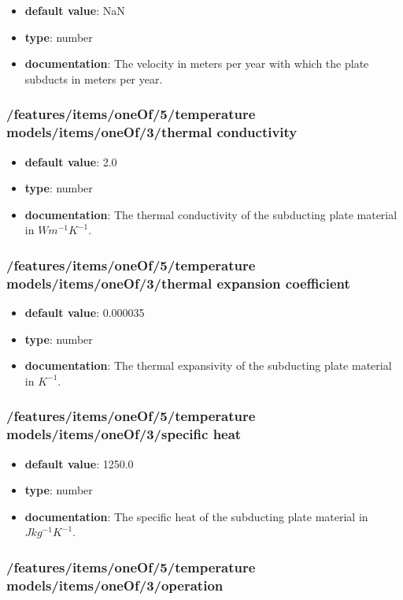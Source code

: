 \begin{itemize}\item {\bf default value}: NaN
\item {\bf type}: number
\item {\bf documentation}: The velocity in meters per year with which the plate subducts in meters per year.
\end{itemize}\subsubsection{/features/items/oneOf/5/temperature models/items/oneOf/3/thermal conductivity}
\begin{itemize}\item {\bf default value}: 2.0
\item {\bf type}: number
\item {\bf documentation}: The thermal conductivity of the subducting plate material in $W m^{-1} K^{-1}$.
\end{itemize}\subsubsection{/features/items/oneOf/5/temperature models/items/oneOf/3/thermal expansion coefficient}
\begin{itemize}\item {\bf default value}: 0.000035
\item {\bf type}: number
\item {\bf documentation}: The thermal expansivity of the subducting plate material in $K^{-1}$.
\end{itemize}\subsubsection{/features/items/oneOf/5/temperature models/items/oneOf/3/specific heat}
\begin{itemize}\item {\bf default value}: 1250.0
\item {\bf type}: number
\item {\bf documentation}: The specific heat of the subducting plate material in $J kg^{-1} K^{-1}$.
\end{itemize}\subsubsection{/features/items/oneOf/5/temperature models/items/oneOf/3/operation}

